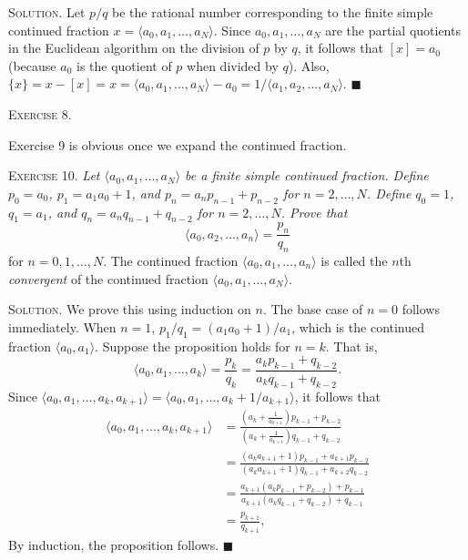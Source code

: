 \documentclass[11pt, leqno]{article}
\newcommand{\done}{\ensuremath{\blacksquare}}
\begin{document}
\textsc{Solution}. Let $p/q$ be the rational number corresponding to the finite simple continued fraction $x=\langle a_0, a_1,\ldots,a_N \rangle$. Since $a_0, a_1, \ldots, a_N$ are the partial quotients in the Euclidean algorithm on the division of $p$ by $q$, it follows that $[x] = a_0$ (because $a_0$ is the quotient of $p$ when divided by $q$). Also, $\{x\} = x - [x] = x=\langle a_0, a_1,\ldots,a_N \rangle - a_0 = 1/\langle a_1, a_2,\ldots,a_N \rangle$. \done

\textsc{Exercise 8}.

Exercise 9 is obvious once we expand the continued fraction.

\textsc{Exercise 10}. \emph{Let $\langle a_0, a_1,\ldots,a_N \rangle$ be a finite simple continued fraction. Define $p_0 = a_0$, $p_1 = a_1a_0+1$, and $p_n = a_np_{n-1} + p_{n-2}$ for $n=2,\ldots, N$. Define $q_0=1$, $q_1=a_1$, and $q_n = a_nq_{n-1} + q_{n-2}$ for $n=2,\ldots, N$. Prove that 
\begin{displaymath}
\langle a_0, a_2,\ldots,a_n \rangle = \frac{p_n}{q_n}
\end{displaymath}}for $n=0,1,\ldots, N$. The continued fraction $\langle a_0, a_1,\ldots,a_n \rangle $ is called the $n$th \emph{convergent} of the continued fraction $\langle a_0, a_1, \ldots, a_N\rangle$.

\textsc{Solution}. We prove this using induction on $n$. The base case of $n=0$ follows immediately. When $n=1$, $p_1/q_1 = (a_1a_0+1)/a_1$, which is the continued fraction $\langle a_0, a_1 \rangle$. Suppose the proposition holds for $n=k$. That is, 
\begin{displaymath}
\langle a_0, a_1, \ldots, a_k \rangle = \frac{p_k}{q_k} = \frac{a_kp_{k-1} + q_{k-2}}{a_kq_{k-1} + q_{k-2}}.
\end{displaymath}
Since $\langle a_0, a_1, \ldots, a_k, a_{k+1} \rangle = \langle a_0, a_1, \ldots, a_k+1/a_{k+1} \rangle$, it follows that
\begin{align*}
  \langle a_0, a_1, \ldots, a_k, a_{k+1} \rangle &= \frac{\left( a_k+\frac{1}{a_{k+1}} \right)p_{k-1} + p_{k-2}}{\left( a_k+\frac{1}{a_{k+1}} \right)q_{k-1} + q_{k-2}} \\
                                                            &= \frac{(a_ka_{k+1} + 1)p_{k-1} + a_{k+1}p_{k-2}}{(a_ka_{k+1} + 1)q_{k-1} + a_{k+2}q_{k-2}} \\
                                                            &= \frac{a_{k+1}(a_kp_{k-1} + p_{k-2}) + p_{k-1}}{a_{k+1}(a_kq_{k-1} + q_{k-2}) + q_{k-1}} \\
  &= \frac{p_{k+1}}{q_{k+1}},
\end{align*}
By induction, the proposition follows. \done
\end{document}
